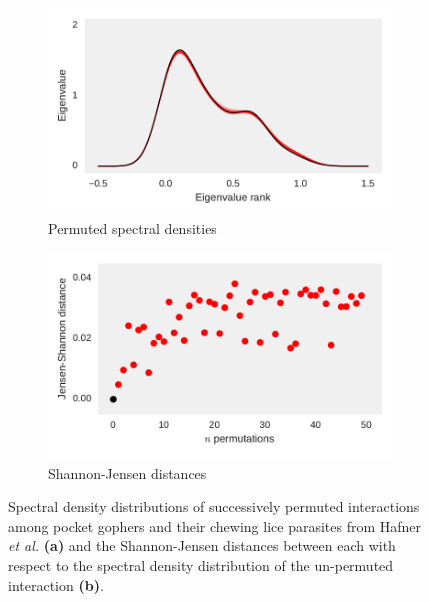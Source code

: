 \begin{figure}
    \centering
    \begin{subfigure}[b]{0.45\textwidth}
        \includegraphics[width=\textwidth]{FishPoo/figures/gopher_louse_spectral_density_permutations}
        \small
        \caption{Permuted spectral densities}
    \end{subfigure}
    \begin{subfigure}[b]{0.45\textwidth}
        \includegraphics[width=\textwidth]{FishPoo/figures/gopher_louse_spectral_density_permutation_distances}
        \small
        \caption{Shannon-Jensen distances}
    \end{subfigure}
    \caption{Spectral density distributions of successively permuted interactions among pocket gophers and their chewing lice parasites from Hafner {\em et al.} \cite{hafner1994disparate} \textbf{(a)} and the Shannon-Jensen distances between each with respect to the spectral density distribution of the un-permuted interaction \textbf{(b)}.}
    \label{fig:FP_permuted_distances}
\end{figure}